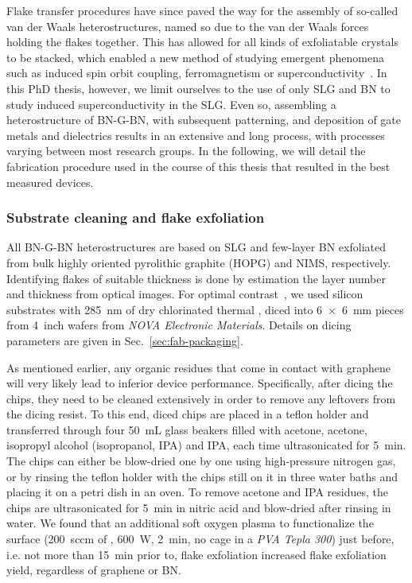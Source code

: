 Flake transfer procedures have since paved the way for the assembly of so-called van der Waals heterostructures, named so due to the van der Waals forces holding the flakes together.
%
This has allowed for all kinds of exfoliatable crystals to be stacked, which enabled a new method of studying emergent phenomena such as induced spin orbit coupling, ferromagnetism or superconductivity~\cite{geimVanWaalsHeterostructures2013a}.
%
In this PhD thesis, however, we limit ourselves to the use of only SLG and BN to study induced superconductivity in the SLG.
%
Even so, assembling a heterostructure of BN-G-BN, with subsequent patterning, and deposition of gate metals and dielectrics results in an extensive and long process, with processes varying between most research groups.
% 
In the following, we will detail the fabrication procedure used in the course of this thesis that resulted in the best measured devices.

\subsubsection{Substrate cleaning and flake exfoliation}

All BN-G-BN heterostructures are based on SLG and few-layer BN exfoliated from bulk highly oriented pyrolithic graphite (HOPG) and NIMS, respectively.
% 
Identifying flakes of suitable thickness is done by estimation the layer number and thickness from optical images.
% 
For optimal contrast~\cite{blakeMakingGrapheneVisible2007b}, we used silicon substrates with \SI{285}{\nano\meter} of dry chlorinated thermal , diced into \SI{6x6}{\milli\meter} pieces from \SI{4}{inch} wafers from \textit{NOVA Electronic Materials}.
% 
Details on dicing parameters are given in Sec.~\ref{sec:fab-packaging}.


As mentioned earlier, any organic residues that come in contact with graphene will very likely lead to inferior device performance.
% 
Specifically, after dicing the chips, they need to be cleaned extensively in order to remove any leftovers from the dicing resist.
% 
To this end, diced chips are placed in a teflon holder and transferred through four \SI{50}{\milli\liter} glass beakers filled with acetone, acetone, isopropyl alcohol (isopropanol, IPA) and IPA, each time ultrasonicated for \SI{5}{\minute}.
% 
The chips can either be blow-dried one by one using high-pressure nitrogen gas, or by rinsing the teflon holder with the chips still on it in three water baths and placing it on a petri dish in an oven.
% 
To remove acetone and IPA residues, the chips are ultrasonicated for \SI{5}{\minute} in nitric acid and blow-dried after rinsing in water.
% 
We found that an additional soft oxygen plasma to functionalize the  surface (\SI{200}{sccm} of , \SI{600}{\watt}, \SI{2}{\minute}, no cage in a \textit{PVA Tepla 300}) just before, i.e. not more than \SI{15}{\minute} prior to, flake exfoliation increased flake exfoliation yield, regardless of graphene or BN.

